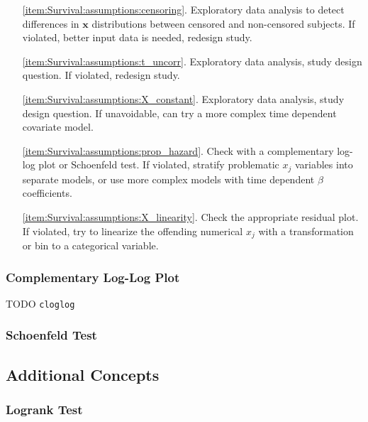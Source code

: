 \begin{itemize}[noitemsep]
\item[\cref{item:Survival:assumptions:censoring}.] Exploratory data analysis to detect differences in $\mathbf{x}$ distributions between censored and non-censored subjects. If violated, better input data is needed, redesign study.

\item[\cref{item:Survival:assumptions:t_uncorr}.] Exploratory data analysis, study design question. If violated, redesign study.

\item[\cref{item:Survival:assumptions:X_constant}.] Exploratory data analysis, study design question. If unavoidable, can try a more complex time dependent covariate model.

\item[\cref{item:Survival:assumptions:prop_hazard}.] Check with a complementary log-log plot or Schoenfeld test. If violated, stratify problematic $x_{j}$ variables into separate models, or use more complex models with time dependent $\beta$ coefficients.

\item[\cref{item:Survival:assumptions:X_linearity}.] Check the appropriate residual plot. If violated, try to linearize the offending numerical $x_{j}$ with a transformation or bin to a categorical variable.
\end{itemize}

\subsubsection{Complementary Log-Log Plot}
\label{additional:Survival:assumptions:cloglog}
TODO \texttt{cloglog}

\subsubsection{Schoenfeld Test}
\label{additional:Survival:assumptions:schoenfeld}

\subsection{Additional Concepts}
\label{additional:Survival:additional}

\subsubsection{Logrank Test}
\label{additional:Survival:additional:logrank}

